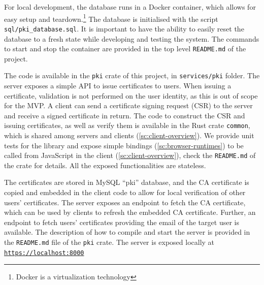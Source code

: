 For local development, 
the database runs in a Docker container, which allows
for easy setup and teardown.\footnote{Docker is a virtualization technology} 
The database is initialised with the script \texttt{sql/pki\_database.sql}.
It is important to have the ability
to easily reset the database to a fresh state 
while developing and testing the system.
The commands to start and stop the container are provided
in the top level \texttt{README.md} of the project.

The code is available in the \texttt{pki} crate
of this project, in \texttt{services/pki} folder.
The server exposes a simple API
to issue certificates to users. 
When issuing a certificate, validation is not performed
on the user identity, as this is out of scope for the MVP.
A client can send a certificate signing request (CSR)
to the server and receive a signed certificate in return.
The code to construct the CSR and issuing certificates, as well as 
verify them is available in the Rust crate \texttt{common},
which is shared among servers and clients (\cref{sc:client-overview}).
We provide unit tests for the library and expose simple bindings (\cref{sc:browser-runtimes}) to be
called from JavaScript in the client (\cref{sc:client-overview}), check the \texttt{README.md}
of the crate for details. All the exposed functionalities are stateless.

The certificates are stored in MySQL ``pki'' database, and the CA
certificate is copied and embedded in the client code to allow
for local verification of other users' certificates.
The server exposes an endpoint to fetch the
CA certificate, which can be used by clients to
refresh the embedded CA certificate.
Further, an endpoint to fetch users' certificates providing the
email of the target user is available.
The description of how to compile and start the server is
provided in the \texttt{README.md} file of the \texttt{pki} crate.
The server is exposed locally at \texttt{\url{https://localhost:8000}}



